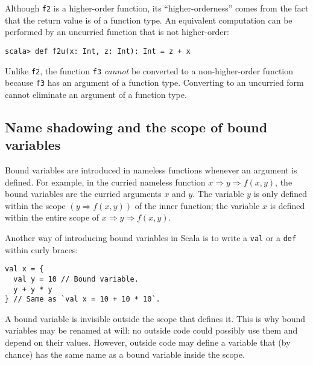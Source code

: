 Although \texttt{}\lstinline!f2!
is a higher-order function, its ``higher-orderness'' comes from
the fact that the return value is of a function type. An equivalent
computation can be performed by an uncurried function that is not
higher-order:
\begin{lstlisting}
scala> def f2u(x: Int, z: Int): Int = z + x
\end{lstlisting}
Unlike \lstinline!f2!,
the function \lstinline!f3!
\emph{cannot} be converted to a non-higher-order function because
\lstinline!f3! has an argument
of a function type. Converting to an uncurried form cannot eliminate
an argument of a function type.

\subsection{Name shadowing and the scope of bound variables}

Bound variables are introduced in nameless functions whenever an argument
is defined. For example, in the curried nameless function $x\Rightarrow y\Rightarrow f(x,y)$,
the bound variables are the curried arguments $x$ and $y$. The variable
$y$ is only defined within the scope $\left(y\Rightarrow f(x,y)\right)$
of the inner function; the variable $x$ is defined within the entire
scope of $x\Rightarrow y\Rightarrow f(x,y)$.

Another way of introducing bound variables in Scala is to write a
\lstinline!val! or a \lstinline!def!
within curly braces:
\begin{lstlisting}
val x = {
  val y = 10 // Bound variable.
  y + y * y
} // Same as `val x = 10 + 10 * 10`.
\end{lstlisting}
A bound variable is invisible outside the scope that defines it. This
is why bound variables may be renamed at will: no outside code could
possibly use them and depend on their values. However, outside code
may define a variable that (by chance) has the same name as a bound
variable inside the scope.

